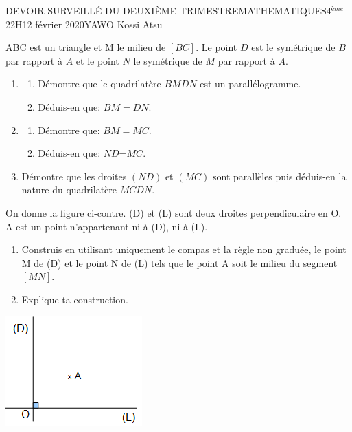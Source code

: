 \documentclass[12pt,a4paper]{book}
\newcommand{\prof}{YAWO Kossi Atsu}
\newcommand{\matiere}{MATHEMATIQUES}
\newcommand{\classe}{4$^{ème}$}
\begin{document}
\begin{devoir}{DEVOIR SURVEILLÉ DU DEUXIÈME TRIMESTRE}{\matiere}{\classe}{2}{2H}{12 février 2020}{\prof}
\begin{exo}[4]
ABC est un triangle et M le milieu de $[BC]$. Le point $D$ est le symétrique de $B$ par rapport à $A$ et le point $N$ le symétrique de $M$ par rapport à $A$.
\begin{enumerate}
\item \begin{enumerate}
\item Démontre que le quadrilatère $BMDN$ est un parallélogramme.
\item Déduis-en que: $BM=DN$.
\end{enumerate}
\item \begin{enumerate}
\item Démontre que: $BM=MC$.
\item Déduis-en que: $ND$=$MC$. 
\end{enumerate} 
\item Démontre que les droites $(ND)$ et $(MC)$ sont parallèles puis déduis-en la nature du quadrilatère $MCDN$.
\end{enumerate}
\end{exo}

\begin{exo}[2]
\begin{multicols}{2}
On donne la figure ci-contre. (D) et (L) sont deux droites perpendiculaire en O. A est un point n'appartenant ni à (D), ni à (L).
\begin{enumerate}
\item Construis en utilisant uniquement le compas et la règle non graduée, le point M de (D) et le point N de (L) tels que le point A soit le milieu du segment $[MN]$.
\item Explique ta construction.
\end{enumerate}
\includegraphics[scale=0.9]{images/dev2_2020_img1.png}
\end{multicols}
\end{exo}

\tableofcompetences
\end{devoir}
\end{document}
